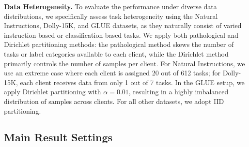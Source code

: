 \documentclass{article} %
\begin{document}
\noindent\textbf{Data Heterogeneity.}
To evaluate the performance under diverse data distributions, we specifically assess task heterogeneity using the Natural Instructions, Dolly-15K, and GLUE datasets, as they naturally consist of varied instruction-based or classification-based tasks. We apply both pathological and Dirichlet partitioning methods: the pathological method skews the number of tasks or label categories available to each client, while the Dirichlet method primarily controls the number of samples per client. For Natural Instructions, we use an extreme case where each client is assigned 20 out of 612 tasks; for Dolly-15K, each client receives data from only 1 out of 7 tasks. In the GLUE setup, we apply Dirichlet partitioning with $\alpha=0.01$, resulting in a highly imbalanced distribution of samples across clients. For all other datasets, we adopt IID partitioning.


\subsection{Main Result Settings}\label{appendixsubsection:main_settings}
\end{document}

